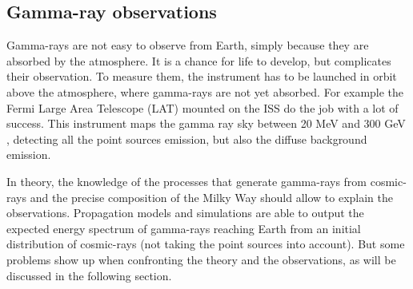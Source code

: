 

\subsection{Gamma-ray observations}

Gamma-rays are not easy to observe from Earth, simply because they are absorbed by the atmosphere. It is a chance for life to develop, but complicates their observation. To measure them, the instrument has to be launched in orbit above the atmosphere, where gamma-rays are not yet absorbed. For example the Fermi Large Area Telescope (LAT) mounted on the ISS do the job with a lot of success. This instrument maps the gamma ray sky between 20 MeV and 300 GeV , detecting all the point sources emission, but also the diffuse background emission.




In theory, the knowledge of the processes that generate gamma-rays from cosmic-rays and the precise composition of the Milky Way should allow to explain the observations. Propagation models and simulations are able to output the expected energy spectrum of gamma-rays reaching Earth from an initial distribution of cosmic-rays (not taking the point sources into account). But some problems show up when confronting the theory and the observations, as will be discussed in the following section.



